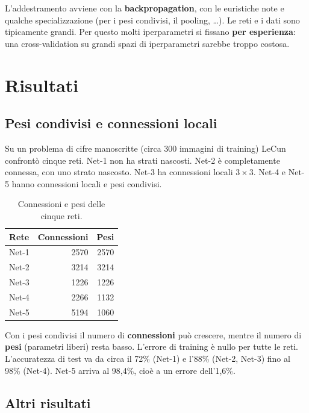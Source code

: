 L'addestramento avviene con la \textbf{backpropagation}, con le euristiche note e qualche specializzazione (per i
pesi condivisi, il pooling, \dots). Le reti e i dati sono tipicamente grandi. Per questo molti iperparametri si
fissano \textbf{per esperienza}: una cross-validation su grandi spazi di iperparametri sarebbe troppo costosa.

\section{Risultati}

\subsection{Pesi condivisi e connessioni locali}

Su un problema di cifre manoscritte (circa 300 immagini di training) LeCun confrontò cinque reti. Net-1 non ha
strati nascosti. Net-2 è completamente connessa, con uno strato nascosto. Net-3 ha connessioni locali $3\times3$.
Net-4 e Net-5 hanno connessioni locali e pesi condivisi.

\begin{table}[ht]
\centering\small
\caption{Connessioni e pesi delle cinque reti.}
\begin{tabular}{lrr}
\toprule
Rete & Connessioni & Pesi \\
\midrule
Net-1 & 2570 & 2570 \\
Net-2 & 3214 & 3214 \\
Net-3 & 1226 & 1226 \\
Net-4 & 2266 & 1132 \\
Net-5 & 5194 & 1060 \\
\bottomrule
\end{tabular}
\end{table}

Con i pesi condivisi il numero di \textbf{connessioni} può crescere, mentre il numero di \textbf{pesi} (parametri
liberi) resta basso. L'errore di training è nullo per tutte le reti. L'accuratezza di test va da circa il 72\%
(Net-1) e l'88\% (Net-2, Net-3) fino al 98\% (Net-4). Net-5 arriva al 98,4\%, cioè a un errore dell'1,6\%.

\subsection{Altri risultati}


